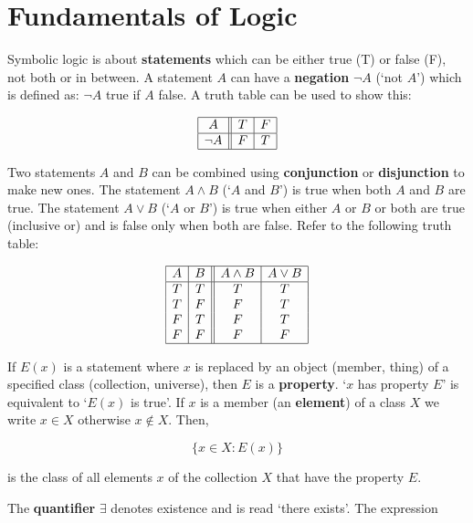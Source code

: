 \section{Fundamentals of Logic}

Symbolic logic is about \textbf{statements} which can be either true (T) or false (F), not both or in between.
A statement $A$ can have a \textbf{negation} $\neg A$ (`not $A$') which is defined as: $\neg A$ true if $A$ false.
A truth table can be used to show this:

$$
\begin{array}{|c||c|c|}
    \hline
    A & T & F \\
    \hline{}
    \neg A & F & T \\
    \hline
\end{array}
$$

Two statements $A$ and $B$ can be combined using \textbf{conjunction} or \textbf{disjunction} to make new ones.
The statement $A \land B$ (`$A$ and $B$') is true when both $A$ and $B$ are true.
The statement $A \lor B$ (`$A$ or $B$') is true when either $A$ or $B$ or both are true (inclusive or) and is false only when both are false.
Refer to the following truth table:

$$
\begin{array}{|c|c||c|c|}
    \hline
    A & B & A \land B & A \lor B \\
    \hline
    T & T & T & T \\
    T & F & F & T \\
    F & T & F & T \\
    F & F & F & F \\
    \hline
\end{array}
$$

If $E(x)$ is a statement where $x$ is replaced by an object (member, thing) of a specified class (collection, universe), then $E$ is a \textbf{property}.
`$x$ has property $E$' is equivalent to `$E(x)$ is true'.
If $x$ is a member (an \textbf{element}) of a class $X$ we write $x \in X$ otherwise $x \not\in X$.
Then,

$$
\{x \in X : E(x)\}
$$

\noindent is the class of all elements $x$ of the collection $X$ that have the property $E$.

The \textbf{quantifier} $\exists$ denotes existence and is read `there exists'.
The expression

